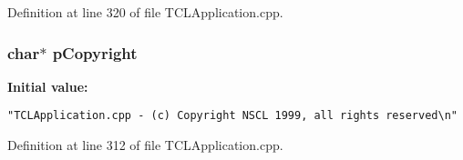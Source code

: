 Definition at line 320 of file TCLApplication.cpp.
\subsubsection{\setlength{\rightskip}{0pt plus 5cm}char$\ast$ p\-Copyright\hspace{0.3cm}{\tt  [static]}}\label{TCLApplication_8cpp_a1}


{\bf Initial value:}

\footnotesize\begin{verbatim}
"TCLApplication.cpp - (c) Copyright NSCL 1999, all rights reserved\n"\end{verbatim}\normalsize 


Definition at line 312 of file TCLApplication.cpp.